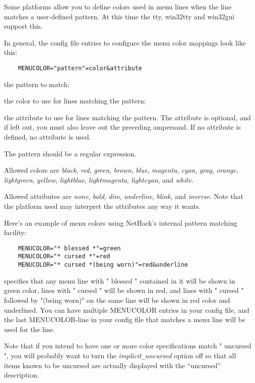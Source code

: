 Some platforms allow you to define colors used in menu lines when the
line matches a user-defined pattern. At this time the tty, win32tty and
win32gui support this.

In general, the config file entries to configure the menu color mappings
look like this:
\begin{verbatim}
    MENUCOLOR="pattern"=color&attribute
\end{verbatim}

\blist{}
\item[\ib{pattern}]
the pattern to match;
\item[\ib{color}]
the color to use for lines matching the pattern;
\item[\ib{attribute}]
the attribute to use for lines matching the pattern. The attribute is
optional, and if left out, you must also leave out the preceding ampersand.
If no attribute is defined, no attribute is used.
\elist

The pattern should be a regular expression.

Allowed colors are {\it black}, {\it red}, {\it green}, {\it brown},
{\it blue}, {\it magenta}, {\it cyan}, {\it gray}, {\it orange},
{\it lightgreen}, {\it yellow}, {\it lightblue}, {\it lightmagenta},
{\it lightcyan}, and {\it white}.

Allowed attributes are {\it none}, {\it bold}, {\it dim}, {\it underline},
{\it blink}, and {\it inverse}.
Note that the platform used may interpret the attributes any way it
wants.

Here's an example of menu colors using NetHack's internal
pattern matching facility:

\begin{verbatim}
    MENUCOLOR="* blessed *"=green
    MENUCOLOR="* cursed *"=red
    MENUCOLOR="* cursed *(being worn)"=red&underline
\end{verbatim}

specifies that any menu line with " blessed " contained
in it will be shown in green color, lines with " cursed " will be
shown in red, and lines with " cursed " followed by "(being worn)"
on the same line will be shown in red color and underlined.
You can have multiple MENUCOLOR entries in your config file,
and the last MENUCOLOR-line in your config file that matches
a menu line will be used for the line.

Note that if you intend to have one or more color specifications match
" uncursed ", you will probably want to turn the
{\it implicit\verb+_+uncursed\/}
option off so that all items known to be uncursed are actually
displayed with the ``uncursed'' description.

